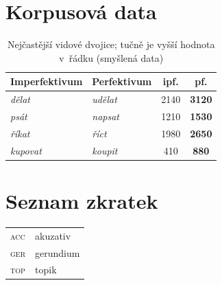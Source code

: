 \documentclass[department=kol, type=ba, language=czech, gender=x, bib=apa]{upolthesis}
\newcommand{\gm}[1]{\textsc{\MakeLowercase{#1}}}  %
\begin{document}
\chapter{Korpusová data}
\label{app:data}
\begin{table}[htbp]
  \centering
  \begin{tabular}{l l S[table-format=4.0] S[table-format=4.0]}
    \toprule
    {Imperfektivum} & {Perfektivum} & {ipf.} & {pf.} \\
    \midrule
    \emph{dělat}   & \emph{udělat}   & 2140 & \bfseries 3120 \\
    \emph{psát}    & \emph{napsat}   & 1210 & \bfseries 1530 \\
    \emph{říkat}   & \emph{říct}     & 1980 & \bfseries 2650 \\
    \emph{kupovat} & \emph{koupit}   &  410 & \bfseries  880 \\
    \bottomrule
  \end{tabular}
  \caption{Nejčastější vidové dvojice; tučně je vyšší hodnota v~řádku
    (smyšlená data)}
  \label{tab:dvojice}
\end{table}

\chapter{Seznam zkratek}
\label{app:zkratky}
\begin{tabular}{@{}ll@{}}
  \gm{acc} & akuzativ \\
  \gm{ger} & gerundium \\
  \gm{top} & topik \\
\end{tabular}
\end{document}
